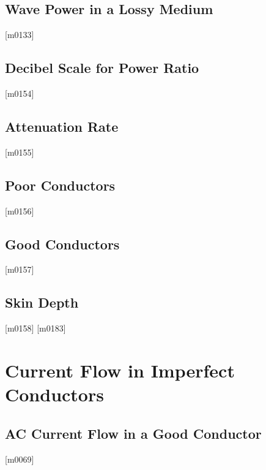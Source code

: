 \documentclass[10pt,letterpaper,twocolumn,openany]{book}
\theoremstyle{definition} %
\begin{document}
    \section{Wave Power in a Lossy Medium}
{\color{blue}\tiny[m0133]}      
      \vfill\break
    \section{Decibel Scale for Power Ratio}
{\color{blue}\tiny[m0154]}      
      \vfill\break
    \section{Attenuation Rate}
{\color{blue}\tiny[m0155]}      
      \vfill\break
    \section{Poor Conductors}
{\color{blue}\tiny[m0156]}      
      \vfill\break
    \section{Good Conductors}
{\color{blue}\tiny[m0157]}      
      \vfill\break
    \section{Skin Depth}
{\color{blue}\tiny[m0158]}      
{\color{blue}\tiny[m0183]}    
  \chapter{Current Flow in Imperfect Conductors}
  \thispagestyle{fancy} %
  \fancyhf{}            %
    \section{AC Current Flow in a Good Conductor}
{\color{blue}\tiny[m0069]}      
      \vfill\break
\end{document}
